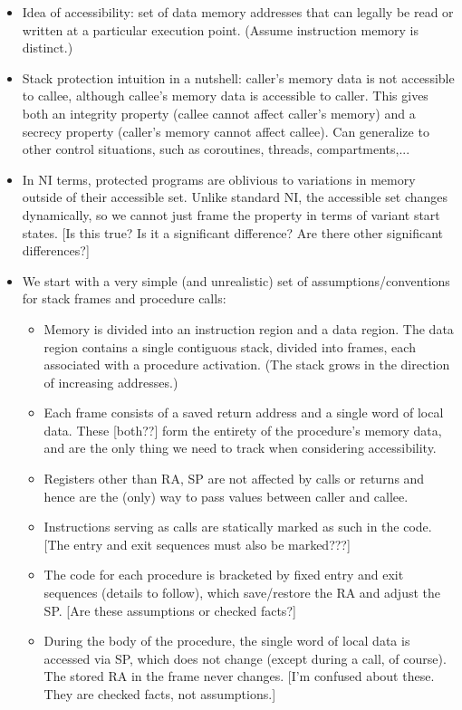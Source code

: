 \documentclass[conference]{IEEEtran}
\begin{document}
\begin{itemize}
\item
  Idea of accessibility: set of data memory addresses that can legally be read or written at a particular execution point.
  (Assume instruction memory is distinct.)
\item
  Stack protection intuition in a nutshell: caller's memory data is not accessible to callee, although callee's memory data is accessible to caller.
  This gives both an integrity property (callee cannot affect caller's memory) and a secrecy property
  (caller's memory cannot affect callee).
  Can generalize to other control situations, such as coroutines, threads, compartments,...
\item
  In NI terms, protected programs are oblivious to variations in memory outside of their accessible set.
  Unlike standard NI, the accessible set changes dynamically, so we cannot just frame the property in terms of
  variant start states. [Is this true? Is it a significant difference? Are there other significant differences?]
\item
  We start with a very simple (and unrealistic) set of assumptions/conventions for stack frames and procedure calls:
  \begin {itemize}
  \item Memory is divided into an instruction region and a data region. The data region contains a single contiguous stack, divided into frames, each associated with a procedure activation. (The stack grows in the direction of increasing addresses.)
  \item Each frame consists of a saved return address and a single word of local data. These [both??] form the entirety of the procedure's memory data, and are the only thing we need to track when considering accessibility.
  \item Registers other than RA, SP are not affected by calls or returns and hence are the (only) way to pass values between caller and callee.
  \item Instructions serving as calls are statically marked as such in the code. [The entry and exit sequences must also be marked???]
  \item The code for each procedure is bracketed by fixed entry and exit sequences (details to follow), which save/restore the RA and
    adjust the SP. [Are these assumptions or checked facts?] 
  \item During the body of the procedure, the single word of local data is accessed via SP, which does not change (except during a call, of course).  The stored RA in the frame never changes. [I'm confused about these. They are checked facts, not assumptions.]

\end{itemize}
\end{itemize}
\end{document}

